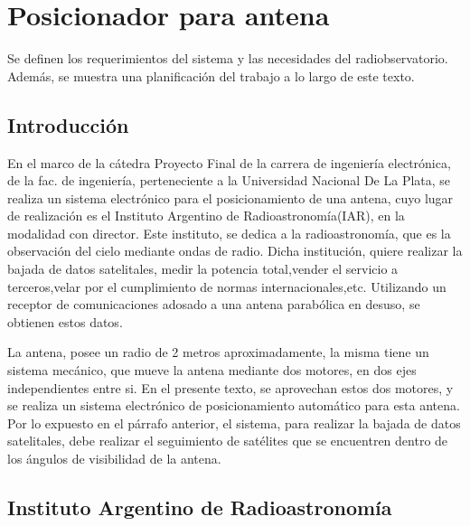 \renewcommand{\chaptername}{Requerimientos para estación terrena}
\chapter{Posicionador para antena }
\begin{center}
\begin{tcolorbox}[colback=gray!5!white, %
colframe=gray!75!black,
title= \center{\Large{Resumen}} ]

Se definen los requerimientos del sistema y las necesidades del radiobservatorio. Además, se muestra una planificación del trabajo a lo largo de este texto. 
\end{tcolorbox}
\end{center}    
\section{Introducción}  %
En el marco de la cátedra Proyecto Final de la carrera de ingeniería electrónica, de la fac. de ingeniería, perteneciente a la Universidad Nacional De La Plata, se realiza un sistema electrónico para el  posicionamiento de una antena, cuyo lugar de realización es el Instituto Argentino de Radioastronomía(IAR), en la modalidad con director. Este instituto, se dedica a la radioastronomía, que es la observación del cielo mediante ondas de radio. Dicha institución, quiere realizar la bajada de datos satelitales, medir la potencia total,vender el servicio a terceros,velar por el cumplimiento de normas internacionales,etc. Utilizando un receptor de comunicaciones adosado a una antena parabólica en desuso, se obtienen estos datos. 

La antena, posee un radio de 2 metros aproximadamente, la misma tiene un sistema mecánico, que mueve la antena mediante dos motores, en dos ejes independientes entre si. En el presente texto, se aprovechan estos dos motores, y se realiza un sistema electrónico de posicionamiento automático para esta antena. Por lo expuesto en el párrafo anterior, el sistema, para realizar la bajada de datos satelitales, debe realizar el seguimiento de satélites que se encuentren dentro de los ángulos de visibilidad de la antena.

\section{Instituto Argentino de Radioastronomía} 

